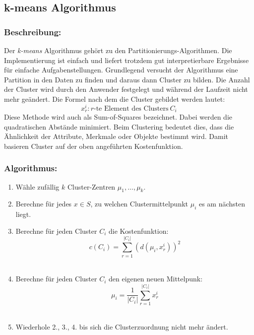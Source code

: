 \subsection{k-means Algorithmus}
\subsubsection{Beschreibung:}
Der \textit{k-means} Algorithmus gehört zu den Partitionierungs-Algorithmen. Die Implementierung ist einfach und liefert trotzdem gut interpretierbare Ergebnisse für einfache Aufgabenstellungen. Grundlegend versucht der Algorithmus eine Partition in den Daten zu finden und daraus dann Cluster zu bilden. Die Anzahl der Cluster wird durch den Anwender festgelegt und während der Laufzeit nicht mehr geändert. Die Formel nach dem die Cluster gebildet werden lautet: \cite{pell91} \\

\[x_r^i: r\textrm{-te Element des Clusters}\ C_i\]
Diese Methode wird auch als Sum-of-Squares bezeichnet. Dabei werden die quadratischen Abstände minimiert. Beim Clustering bedeutet dies, dass die Ähnlichkeit der Attribute, Merkmale oder Objekte bestimmt wird. Damit basieren Cluster auf der oben angeführten Kostenfunktion.

\subsubsection{Algorithmus:}
\begin{enumerate}
\item Wähle zufällig \(k\) Cluster-Zentren \(\mu_1,\dotsc,\mu_k\).\\


\item Berechne für jedes \(x \in S\), zu welchen Clustermittelpunkt \(\mu_i\) es am nächsten liegt.\\


\item Berechne für jeden Cluster \(C_i\) die Kostenfunktion:\\
\[c(C_i) = \displaystyle\sum_{r=1}^{|C_i|}(d(\mu_i,x_r^i))^2\]\\

\item Berechne für jeden Cluster \(C_i\) den eigenen neuen Mittelpunk:\\
\[ \mu_i =\frac{1}{|C_i|} \displaystyle\sum_{r=1}^{|C_i|}x_r^i\]\\

\item Wiederhole 2., 3., 4. bis sich die Clusterzuordnung nicht mehr ändert.\\




\end{enumerate}

